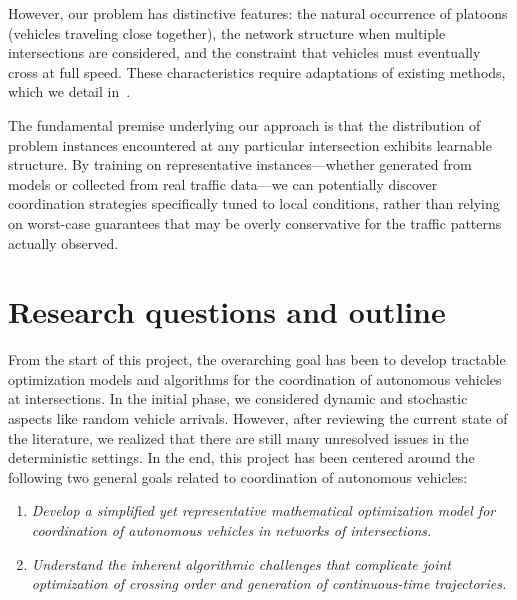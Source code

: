 \documentclass[a4paper]{report}
\theoremstyle{definition}
\theoremstyle{plain}
\begin{document}
However, our problem has distinctive features: the natural occurrence of
platoons (vehicles traveling close together), the network structure when
multiple intersections are considered, and the constraint that vehicles must
eventually cross at full speed. These characteristics require adaptations of
existing methods, which we detail in~.

The fundamental premise underlying our approach is that the distribution of
problem instances encountered at any particular intersection exhibits learnable
structure. By training on representative instances---whether generated from models
or collected from real traffic data---we can potentially discover coordination
strategies specifically tuned to local conditions, rather than relying on
worst-case guarantees that may be overly conservative for the traffic patterns
actually observed.

\section{Research questions and outline}


From the start of this project, the overarching goal has been to develop
tractable optimization models and algorithms for the coordination of autonomous
vehicles at intersections.
%
%
In the initial phase, we considered dynamic and stochastic aspects like random
vehicle arrivals. However, after reviewing the current state of the literature,
we realized that there are still many unresolved issues in the deterministic
settings.
%
In the end, this project has been centered around the following two general
goals related to coordination of autonomous vehicles:

\begin{enumerate}[label=\textbullet, leftmargin=3em, rightmargin=4em]
  \item \emph{Develop a simplified yet representative mathematical optimization model
        for coordination of autonomous vehicles in networks of intersections.}

  \item \emph{Understand the inherent algorithmic challenges that complicate joint
        optimization of crossing order and generation of continuous-time
        trajectories.}
\end{enumerate}
\end{document}
